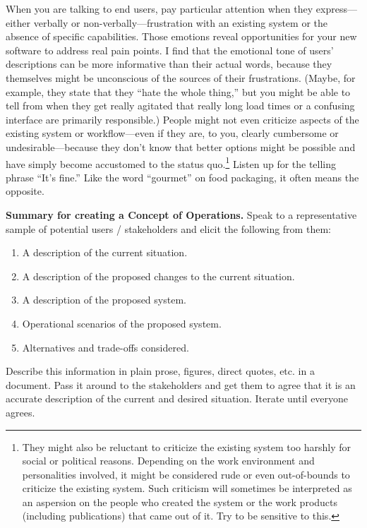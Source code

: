 \documentclass[12pt,oneside]{book}
\begin{document}
When you are talking to end users, pay particular attention when they express---either verbally or non-verbally---frustration with an existing system or the absence of specific capabilities. Those emotions reveal opportunities for your new software to address real pain points. I find that the emotional tone of users' descriptions can be more informative than their actual words, because they themselves might be unconscious of the sources of their frustrations. (Maybe, for example, they state that they ``hate the whole thing,'' but you might be able to tell from when they get really agitated that really long load times or a confusing interface are primarily responsible.) People might not even criticize aspects of the existing system or workflow---even if they are, to you, clearly cumbersome or undesirable---because they don't know that better options might be possible and have simply become accustomed to the status quo.\footnote{They might also be reluctant to criticize the existing system too harshly for social or political reasons. Depending on the work environment and personalities involved, it might be considered rude or even out-of-bounds to criticize the existing system. Such criticism will sometimes be interpreted as an aspersion on the people who created the system or the work products (including publications) that came out of it. Try to be sensitive to this.} Listen up for the telling phrase ``It's fine.'' Like the word ``gourmet'' on food packaging, it often means the opposite.

\hfill
\begin{mdframed}[everyline=true]
\textbf{Summary for creating a Concept of Operations.} Speak to a representative sample of potential users / stakeholders and elicit the following from them:
\begin{enumerate}
\item A description of the current situation.
\item A description of the proposed changes to the current situation.
\item A description of the proposed system.
\item Operational scenarios of the proposed system.
\item Alternatives and trade-offs considered.
\end{enumerate}

Describe this information in plain prose, figures, direct quotes, etc. in a document. Pass it around to the stakeholders and get them to agree that it is an accurate description of the current and desired situation. Iterate until everyone agrees.
\end{mdframed}
\end{document}
